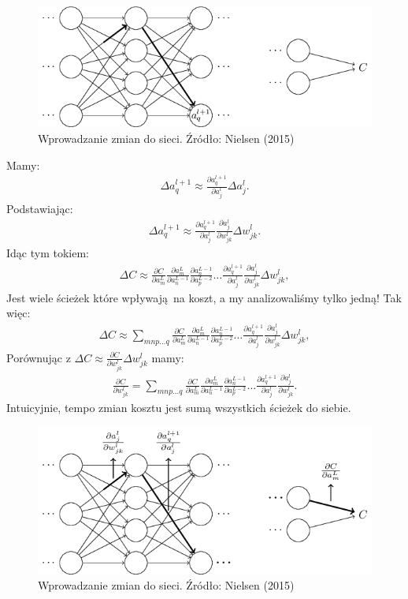 \documentclass[10pt, oneside]{article}
\theoremstyle{remark}
\begin{document}
\begin{figure}[!htpb]
	\centering
	\includegraphics[width=.6\linewidth]{figures/tikz26}
	\caption{Wprowadzanie zmian do sieci. Źródło: Nielsen (2015)}
\end{figure}
Mamy:
\begin{eqnarray}
  \Delta a^{l+1}_q \approx \frac{\partial a^{l+1}_q}{\partial a^l_j} \Delta a^l_j.
\end{eqnarray}
Podstawiając:
\begin{eqnarray}
  \Delta a^{l+1}_q \approx \frac{\partial a^{l+1}_q}{\partial a^l_j} \frac{\partial a^l_j}{\partial w^l_{jk}} \Delta w^l_{jk}.
\end{eqnarray}
Idąc tym tokiem:
\begin{eqnarray}
  \Delta C \approx \frac{\partial C}{\partial a^L_m} 
  \frac{\partial a^L_m}{\partial a^{L-1}_n}
  \frac{\partial a^{L-1}_n}{\partial a^{L-2}_p} \ldots
  \frac{\partial a^{l+1}_q}{\partial a^l_j}
  \frac{\partial a^l_j}{\partial w^l_{jk}} \Delta w^l_{jk},
\end{eqnarray}
Jest wiele ścieżek które wpływają na koszt, a my analizowaliśmy tylko jedną! Tak więc:
\begin{eqnarray} 
  \Delta C \approx \sum_{mnp\ldots q} \frac{\partial C}{\partial a^L_m} 
  \frac{\partial a^L_m}{\partial a^{L-1}_n}
  \frac{\partial a^{L-1}_n}{\partial a^{L-2}_p} \ldots
  \frac{\partial a^{l+1}_q}{\partial a^l_j} 
  \frac{\partial a^l_j}{\partial w^l_{jk}} \Delta w^l_{jk},
\end{eqnarray}
Porównując z $ \Delta C \approx \frac{\partial C}{\partial w^l_{jk}} \Delta w^l_{jk} $ mamy:
\begin{eqnarray} 
  \frac{\partial C}{\partial w^l_{jk}} = \sum_{mnp\ldots q} \frac{\partial C}{\partial a^L_m} 
  \frac{\partial a^L_m}{\partial a^{L-1}_n}
  \frac{\partial a^{L-1}_n}{\partial a^{L-2}_p} \ldots
  \frac{\partial a^{l+1}_q}{\partial a^l_j} 
  \frac{\partial a^l_j}{\partial w^l_{jk}}.
\end{eqnarray}
Intuicyjnie, tempo zmian kosztu jest sumą wszystkich ścieżek do siebie.
\begin{figure}[!htpb]
	\centering
	\includegraphics[width=.6\linewidth]{figures/tikz27}
	\caption{Wprowadzanie zmian do sieci. Źródło: Nielsen (2015)}
\end{figure}
\end{document}
